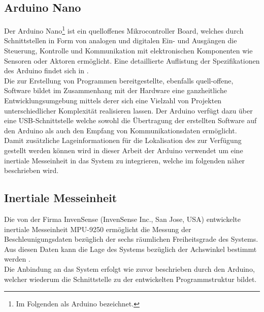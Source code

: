 \subsection{Arduino\textsuperscript{\texttrademark} Nano}
\label{chap.arduino}
Der Arduino\textsuperscript{\texttrademark} Nano\footnote{Im Folgenden als Arduino bezeichnet.} ist ein quelloffenes Mikrocontroller Board, welches durch Schnittstellen in Form von analogen und digitalen Ein- und Ausgängen die Steuerung, Kontrolle und Kommunikation mit elektronischen Komponenten wie Sensoren oder Aktoren ermöglicht. Eine detaillierte Auflistung der Spezifikationen des Arduino findet sich in .\\
Die zur Erstellung von Programmen bereitgestellte, ebenfalls quell-offene, Software bildet im Zusammenhang mit der Hardware eine ganzheitliche Entwicklungsumgebung mittels derer sich eine Vielzahl von Projekten unterschiedlicher Komplexität realisieren lassen. Der Arduino verfügt dazu über eine USB-Schnittstelle welche sowohl die Übertragung der erstellten Software auf den Arduino als auch den Empfang von Kommunikationsdaten ermöglicht.\\
Damit zusätzliche Lageinformationen für die Lokalisation des  zur Verfügung gestellt werden können wird in dieser Arbeit der Arduino verwendet um eine inertiale Messeinheit in das System zu integrieren, welche im folgenden näher beschrieben wird.
\\


\subsection{Inertiale Messeinheit}
\label{chap.imu}
Die von der Firma InvenSense (InvenSense Inc., San Jose, USA) entwickelte inertiale Messeinheit MPU-9250 ermöglicht die Messung der Beschleunigungsdaten bezüglich der sechs räumlichen Freiheitsgrade des Systems. Aus diesen Daten kann die Lage des Systems bezüglich der Achswinkel bestimmt werden \cite{IMU}.\\
Die Anbindung an das System erfolgt wie zuvor beschrieben durch den Arduino, welcher wiederum die Schnittstelle zu der entwickelten Programmstruktur bildet.\\


